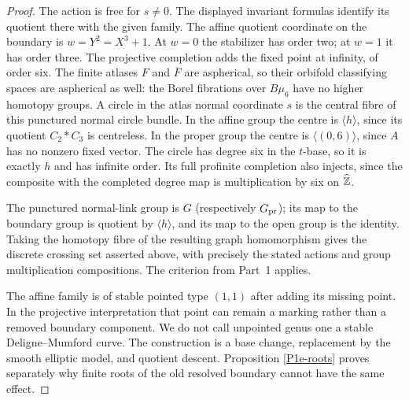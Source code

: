 \begin{proof}
The action is free for $s\ne0$. The displayed invariant formulas
identify its quotient there with the given family. The affine
quotient coordinate on the boundary is $w=Y^2=X^3+1$.
At $w=0$ the stabilizer has order two; at $w=1$ it has order
three. The projective completion adds the fixed point at infinity,
of order six. The finite atlases $F$ and $\overline F$ are
aspherical, so their orbifold classifying spaces are aspherical
as well: the Borel fibrations over $B\mu _6$ have no higher
homotopy groups. A circle in the atlas normal coordinate $s$
is the central fibre of this punctured normal circle bundle.
In the affine group the centre is $\langle h\rangle$, since
its quotient $C_2*C_3$ is centreless. In the proper group the
centre is $\langle(0,6)\rangle$, since $A$ has no nonzero fixed
vector. The circle has degree six in the $t$-base, so it is
exactly $h$ and has infinite order. Its full profinite completion
also injects, since the composite with the completed degree map is
multiplication by six on $\widehat{\mathbb Z}$.

The punctured normal-link group is $G$ (respectively $G_{\rm pr}$);
its map to the boundary group is quotient by $\langle h\rangle$,
and its map to the open group is the identity. Taking the
homotopy fibre of the resulting graph homomorphism gives the
discrete crossing set asserted above, with precisely the stated
actions and group multiplication compositions. The criterion
from Part~1 applies.

The affine family is of stable pointed type $(1,1)$ after adding
its missing point. In the projective interpretation that point
can remain a marking rather than a removed boundary component.
We do not call unpointed genus one a stable Deligne--Mumford
curve. The construction is a base change, replacement by the
smooth elliptic model, and quotient descent. Proposition
\ref{P1e-roots} proves separately why finite roots of the old
resolved boundary cannot have the same effect.
\end{proof}

